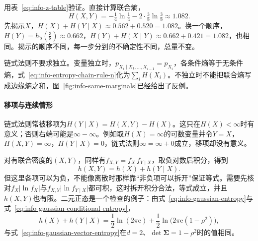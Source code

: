 用表~\eqref{eq:info-z-table}验证。直接计算联合熵，
\[
  H(X,Y)=-\tfrac14\ln\tfrac14-2\cdot\tfrac38\ln\tfrac38\approx1.082.
\]
先揭示$X$，$H(X)+H(Y\mid X)\approx0.562+0.520=1.082$。换一个顺序，$H(Y)=h_{\mathrm{b}}(\tfrac38)\approx0.662$，$H(Y)+H(X\mid Y)\approx0.662+0.421=1.082$，也相同。揭示的顺序不同，每一步分到的不确定性不同，总量不变。

链式法则不要求独立。变量独立时，$p_{X_i\mid X_1,\dots,X_{i-1}}=p_{X_i}$，各条件熵等于无条件熵，式~\eqref{eq:info-entropy-chain-rule-n}化为$\sum_iH(X_i)$。不独立时不能把联合熵写成边缘熵之和，图~\ref{fig:info-same-marginals}已经给出了反例。

\paragraph{移项与连续情形}
链式法则常被移项为$H(Y\mid X)=H(X,Y)-H(X)$。这只在$H(X)<\infty$时有意义；否则右端可能是$\infty-\infty$。例如取$H(X)=\infty$的可数变量并令$Y=X$，$H(X,Y)=\infty$，$H(Y\mid X)=0$，链式法则$\infty=\infty+0$成立，移项却没有意义。

对有联合密度的$(X,Y)$，同样有$f_{X,Y}=f_X\,f_{Y\mid X}$，取负对数后积分，得到
\[
  h(X,Y)=h(X)+h(Y\mid X).
\]
但这里各项可以为负，不能像离散时那样靠“非负项可以拆开”保证等式。需要先核对$f_X\lvert\ln f_X\rvert$与$f_{X,Y}\lvert\ln f_{Y\mid X}\rvert$都可积，这时拆开积分合法，等式成立，并且$h(X,Y)$也有限。二元正态是一个检查的例子：由式~\eqref{eq:info-gaussian-entropy}与式~\eqref{eq:info-gaussian-conditional-entropy}，
\[
  h(X)+h(Y\mid X)=\frac12\ln(2\pi\mathrm{e})+\frac12\ln\bigl(2\pi\mathrm{e}(1-\rho^{2})\bigr),
\]
与式~\eqref{eq:info-gaussian-vector-entropy}在$d=2$、$\det\bm{\Sigma}=1-\rho^{2}$时的值相同。
